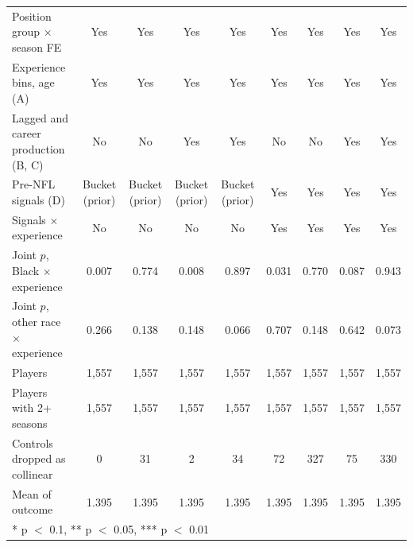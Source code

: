 \begin{table}[H]
{\begin{tabular}[t]{lcccccccc}
Position group $\times$ season FE & Yes & Yes & Yes & Yes & Yes & Yes & Yes & Yes\\
Experience bins, age (A) & Yes & Yes & Yes & Yes & Yes & Yes & Yes & Yes\\
Lagged and career production (B, C) & No & No & Yes & Yes & No & No & Yes & Yes\\
Pre-NFL signals (D) & Bucket (prior) & Bucket (prior) & Bucket (prior) & Bucket (prior) & Yes & Yes & Yes & Yes\\
Signals $\times$ experience & No & No & No & No & Yes & Yes & Yes & Yes\\
Joint $p$, Black $\times$ experience & 0.007 & 0.774 & 0.008 & 0.897 & 0.031 & 0.770 & 0.087 & 0.943\\
Joint $p$, other race $\times$ experience & 0.266 & 0.138 & 0.148 & 0.066 & 0.707 & 0.148 & 0.642 & 0.073\\
Players & 1,557 & 1,557 & 1,557 & 1,557 & 1,557 & 1,557 & 1,557 & 1,557\\
Players with 2+ seasons & 1,557 & 1,557 & 1,557 & 1,557 & 1,557 & 1,557 & 1,557 & 1,557\\
Controls dropped as collinear & 0 & 31 & 2 & 34 & 72 & 327 & 75 & 330\\
Mean of outcome & 1.395 & 1.395 & 1.395 & 1.395 & 1.395 & 1.395 & 1.395 & 1.395\\
\bottomrule
\multicolumn{9}{l}{\rule{0pt}{1em}* p $<$ 0.1, ** p $<$ 0.05, *** p $<$ 0.01}\\
\end{tabular}}
\end{table}

